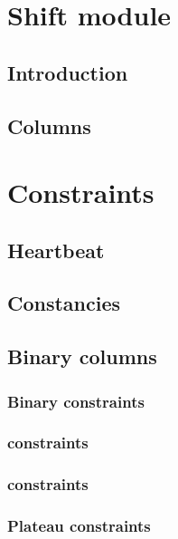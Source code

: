 \section{Shift module}
\subsection{Introduction}                                                         
\subsection{Columns}                                                              
\section{Constraints}
\subsection{Heartbeat}                   \label{shf: heartbeat}                   
\subsection{Constancies}                 \label{shf: constancies}                 
\subsection{Binary columns}
\subsubsection{Binary constraints}                                                
\subsubsection{\shd{} constraints}                                                
\subsubsection{\oli{} constraints}                                                
\subsubsection{Plateau constraints}                                                %
